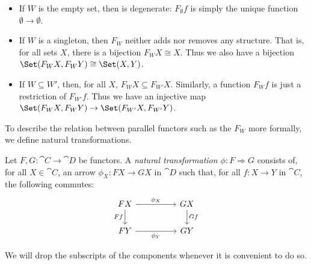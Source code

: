 \documentclass{article}
\begin{document}
\begin{itemize}
  \item If $W$ is the empty set, then is degenerate: $F_\emptyset f$ is simply
    the unique function $\emptyset\to\emptyset$.
  \item If $W$ is a singleton, then $F_W$ neither adds nor removes any structure.
    That is, for all sets $X$, there is a bijection $F_W X\cong X$. Thus we also
    have a bijection $\Set(F_W X,F_W Y)\cong\Set(X,Y)$.
  \item If $W\subseteq W'$, then, for all $X$, $F_W X\subseteq F_{W'}X$. Similarly,
    a function $F_{W}f$ is just a restriction of $F_{W'}f$. Thus we have an
    injective map $\Set(F_W X, F_W Y)\to\Set(F_{W'} X, F_{W'} Y)$.
\end{itemize}

To describe the relation between parallel functors such as the $F_W$ more
formally, we define natural transformations.

\begin{definition}
  Let $F,G:\cat{C}\to\cat{D}$ be functors. A \emph{natural transformation
  $\phi:F\Rightarrow G$} consists of, for all $X\in\cat{C}$,
  an arrow $\phi_X : FX \to GX$ in $\cat{D}$ such that, for all
  $f:X\to Y$ in $\cat{C}$, the following commutes:
  \begin{equation}
    \begin{tikzcd}
      FX && GX \\
      FY && GY
      \arrow["Ff"', from=1-1, to=2-1]
      \arrow["Gf", from=1-3, to=2-3]
      \arrow["{\phi_Y}"', from=2-1, to=2-3]
      \arrow["{\phi_X}", from=1-1, to=1-3]
    \end{tikzcd}
  \end{equation}
\end{definition}

\begin{notation}
  We will drop the subscripts of the components whenever it is convenient to do so.
\end{notation}
\end{document}
